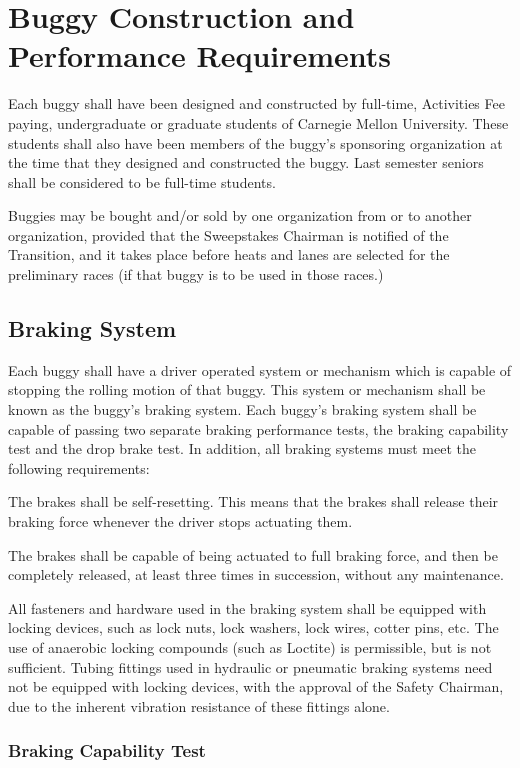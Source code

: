 \chapter{Buggy Construction and Performance Requirements}

	Each buggy shall have been designed and constructed by full-time,
	Activities Fee paying, undergraduate or graduate students of Carnegie Mellon
	University. These students shall also have been members of the buggy's
	sponsoring organization at the time that they designed and constructed the
	buggy. Last semester seniors shall be considered to be full-time students.

	Buggies may be bought and/or sold by one organization from or to another
	organization, provided that the Sweepstakes Chairman is notified of the
	Transition, and it takes place before heats and lanes are selected for the
	preliminary races (if that buggy is to be used in those races.)

\section{Braking System}

	Each buggy shall have a driver operated system or mechanism which is capable of
	stopping the rolling motion of that buggy. This system or mechanism shall be
	known as the buggy's braking system. Each buggy's braking system shall be
	capable of passing two separate braking performance tests, the braking
	capability test and the drop brake test. In addition, all braking systems must
	meet the following requirements:

	The brakes shall be self-resetting. This means that the brakes shall release
	their braking force whenever the driver stops actuating them.

	The brakes shall be capable of being actuated to full braking force, and then
	be completely released, at least three times in succession, without any
	maintenance.

	All fasteners and hardware used in the braking system shall be equipped with
	locking devices, such as lock nuts, lock washers, lock wires, cotter pins, etc.
	The use of anaerobic locking compounds (such as Loctite) is permissible, but is
	not sufficient. Tubing fittings used in hydraulic or pneumatic braking systems
	need not be equipped with locking devices, with the approval of the Safety
	Chairman, due to the inherent vibration resistance of these fittings alone.

\subsection{Braking Capability Test}

